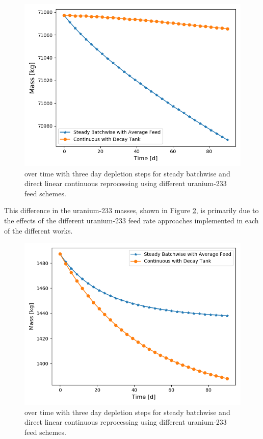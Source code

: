 \begin{figure}[H]
  \centering
  \includegraphics[scale=0.7]{images/prev-cur-th232.png}
  \caption{ over time with three day depletion steps for steady batchwise and direct linear continuous reprocessing using different uranium-233 feed schemes.}
   \label{fig:prev-cur-th232-plot}
\end{figure}

This difference in the uranium-233 masses, shown in Figure \ref{fig:prev-cur-u233-plot}, is primarily due to the effects of the different uranium-233 feed rate approaches implemented in each of the different works.

\begin{figure}[H]
  \centering
  \includegraphics[scale=0.7]{images/prev-cur-u233.png}
  \caption{ over time with three day depletion steps for steady batchwise and direct linear continuous reprocessing using different uranium-233 feed schemes.}
   \label{fig:prev-cur-u233-plot}
\end{figure}

